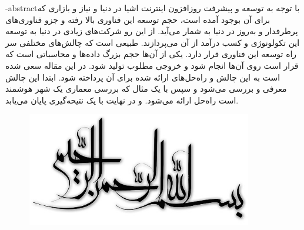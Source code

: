 

\fa-abstract{با توجه به توسعه و پیشرفت روزافزون اینترنت اشیا در دنیا و نیاز و بازاری که برای آن بوجود آمده است، حجم توسعه این فناوری بالا رفته و جزو فناوری‌های پرطرفدار و به‌روز در دنیا به شمار می‌آید.
از این رو شرکت‌های زیادی در دنیا به توسعه این تکولونوژی و کسب درآمد از آن می‌پردازند.
طبیعی است که چالش‌های مختلفی سر راه توسعه این فناوری قرار دارد.
یکی از آن‌ها حجم بزرگ داده‌ها و محاسباتی است که قرار است روی آن‌ها انجام شود و خروجی مطلوب تولید شود.
در این مقاله سعی شده است به این چالش و راه‌حل‌های ارائه شده برای آن پرداخته شود.
ابتدا این چالش معرفی و بررسی می‌شود و سپس با یک مثال که بررسی معماری یک شهر هوشمند است راه‌حل ارائه می‌شود. و در نهایت با یک نتیحه‌گیری پایان می‌یابد.}





\AUTtitle
\vspace*{7cm}
\thispagestyle{empty}
\begin{center}
\includegraphics[height=5cm,width=12cm]{besm}
\end{center}